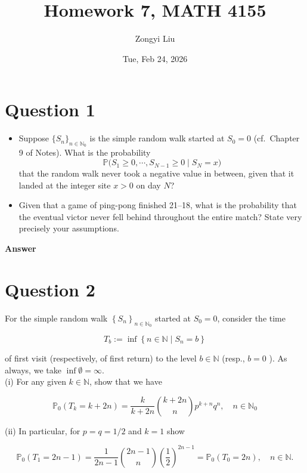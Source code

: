 \documentclass[letterpaper]{article}
\title{Homework 7, MATH 4155}
\author{Zongyi Liu}
\date{Tue, Feb 24, 2026}
\begin{document}
		\maketitle
		\section{Question 1}
		
		\begin{itemize}
			\item[(i)] Suppose $\{S_n\}_{n\in\mathbb{N}_0}$ is the simple random walk started at $S_0=0$ (cf.\ Chapter 9 of Notes). What is the probability
			\[
			\mathbb{P}\bigl(S_1\ge 0,\cdots,S_{N-1}\ge 0 \mid S_N=x\bigr)
			\]
			that the random walk never took a negative value in between, given that it landed at the integer site $x>0$ on day $N$?
			
			\item[(ii)] Given that a game of ping-pong finished 21--18, what is the probability that the eventual victor never fell behind throughout the entire match? State very precisely your assumptions.
		\end{itemize}
		
		\textbf{Answer}
		
		\clearpage
		
		\section{Question 2}
		
		For the simple random walk $\left\{S_{n}\right\}_{n \in \mathbb{N}_{0}}$ started at $S_{0}=0$, consider the time
		
		
		\begin{equation*}
			T_{b}:=\inf \left\{n \in \mathbb{N} \mid S_{n}=b\right\} \tag{0.1}
		\end{equation*}
		
		
		of first visit (respectively, of first return) to the level $b \in \mathbb{N}$ (resp., $b=0$ ). As always, we take $\inf \emptyset=\infty$.\\
		(i) For any given $k \in \mathbb{N}$, show that we have
		
		$$
		\mathbb{P}_{0}\left(T_{k}=k+2 n\right)=\frac{k}{k+2 n}\binom{k+2 n}{n} p^{k+n} q^{n}, \quad n \in \mathbb{N}_{0}
		$$
		
		(ii) In particular, for $p=q=1 / 2$ and $k=1$ show
		
		$$
		\mathbb{P}_{0}\left(T_{1}=2 n-1\right)=\frac{1}{2 n-1}\binom{2 n-1}{n}\left(\frac{1}{2}\right)^{2 n-1}=\mathbb{P}_{0}\left(T_{0}=2 n\right), \quad n \in \mathbb{N} .
		$$
		
\end{document}
